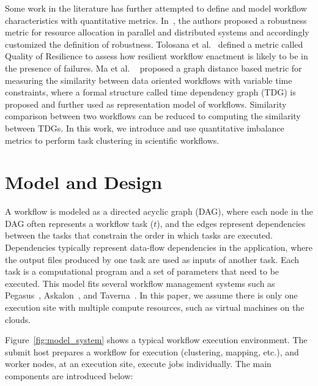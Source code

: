 \documentclass[final,5p,times,twocolumn]{elsarticle}
\begin{document}
Some work in the literature has further attempted to define and model workflow characteristics with quantitative metrics. In~\cite{Ali2004}, the authors proposed a robustness metric for resource allocation in parallel and distributed systems and accordingly customized the definition of robustness. Tolosana et al.~\cite{Tolosana2011} defined a metric called Quality of Resilience to assess how resilient workflow enactment is likely to be in the presence of failures. Ma et al. ~\cite{Ma:2014:GDB:2560969.2561388} proposed a graph distance based metric for measuring the similarity between data oriented workflows with variable time constraints, where a formal structure called time dependency graph (TDG) is proposed and further used as representation model of workflows. Similarity comparison between two workflows can be reduced to computing the similarity between TDGs. In this work, we introduce and use quantitative imbalance metrics to perform task clustering in scientific workflows.

\section{Model and Design}
\label{sec:model}


A workflow is modeled as a directed acyclic graph (DAG), where each node in the DAG often represents a workflow task ($t$), and the edges represent dependencies between the tasks that constrain the order in which tasks are executed. Dependencies typically represent data-flow dependencies in the application, where the output files produced by one task are used as inputs of another task. Each task is a computational program and a set of parameters that need to be executed. 
This model fits several workflow management systems such as Pegasus~\cite{Deelman:2005:PFM:1239649.1239653}, Askalon~\cite{Fahringer:2005:ATS:1064323.1064331}, and Taverna~\cite{Oinn:2006:TLC:1148437.1148448}. In this paper, we assume there is only one execution site with multiple compute resources, such as virtual machines on the clouds. 


Figure~\ref{fig:model_system} shows a typical workflow execution environment. The submit host prepares a workflow for execution (clustering, mapping, etc.), and worker nodes, at an execution site, execute jobs individually. The main components are introduced below:
\end{document}

